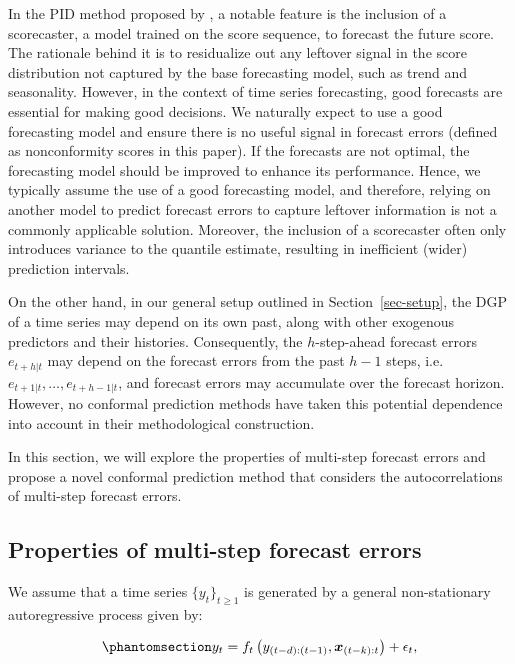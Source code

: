\documentclass[
  11pt,
  a4paper,
]{article}
\theoremstyle{plain}
\theoremstyle{remark}
\begin{document}
In the PID method proposed by \textcite{angelopoulos2024}, a notable
feature is the inclusion of a scorecaster, a model trained on the score
sequence, to forecast the future score. The rationale behind it is to
residualize out any leftover signal in the score distribution not
captured by the base forecasting model, such as trend and seasonality.
However, in the context of time series forecasting, good forecasts are
essential for making good decisions. We naturally expect to use a good
forecasting model and ensure there is no useful signal in forecast
errors (defined as nonconformity scores in this paper). If the forecasts
are not optimal, the forecasting model should be improved to enhance its
performance. Hence, we typically assume the use of a good forecasting
model, and therefore, relying on another model to predict forecast
errors to capture leftover information is not a commonly applicable
solution. Moreover, the inclusion of a scorecaster often only introduces
variance to the quantile estimate, resulting in inefficient (wider)
prediction intervals.

On the other hand, in our general setup outlined in
Section~\ref{sec-setup}, the DGP of a time series may depend on its own
past, along with other exogenous predictors and their histories.
Consequently, the \(h\)-step-ahead forecast errors \(e_{t+h|t}\) may
depend on the forecast errors from the past \(h-1\) steps,
i.e.~\(e_{t+1|t}, \ldots, e_{t+h-1|t}\), and forecast errors may
accumulate over the forecast horizon. However, no conformal prediction
methods have taken this potential dependence into account in their
methodological construction.

In this section, we will explore the properties of multi-step forecast
errors and propose a novel conformal prediction method that considers
the autocorrelations of multi-step forecast errors.

\subsection{Properties of multi-step forecast errors}\label{sec-ppt}

We assume that a time series \(\{y_t\}_{t \geq 1}\) is generated by a
general non-stationary autoregressive process given by:

\begin{equation}\phantomsection\label{eq-dgp}{
y_t = f_{t}\left(y_{(t-d):(t-1)},\bm{x}_{(t-k):t}\right) + \epsilon_t,
}\end{equation}
\end{document}
